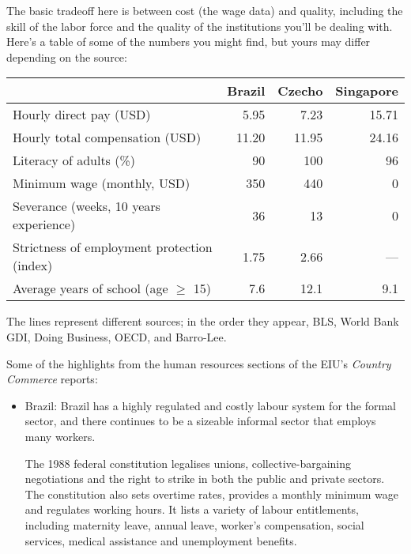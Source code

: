 \documentclass[12pt]{exam}
\begin{document}
\begin{questions}
\begin{solution}
The basic tradeoff here is between cost (the wage data)
and quality, including the skill of the labor force and
the quality of the institutions you'll be dealing with.
Here's a table of some of the numbers you might find,
but yours may differ depending on the source:

\begin{center}
\begin{tabular}{lrrr}
\toprule
		& Brazil & Czecho  & Singapore  \\
\midrule
Hourly direct pay (USD)           & 5.95   & 7.23& 15.71 \\
Hourly total compensation (USD)   & 11.20  & 11.95 & 24.16 \\
\midrule
Literacy of adults  (\%)    &  90 & 100 & 96 \\
\midrule
Minimum wage (monthly, USD) & 350 & 440 & 0 \\
Severance (weeks, 10 years experience)
                    & 36 & 13 & 0 \\
\midrule
Strictness of employment protection (index)
                & 1.75 & 2.66 & --- \\
\midrule
Average years of school (age $\geq$ 15) & 7.6 & 12.1 & 9.1 \\
\bottomrule
\end{tabular}
\end{center}

The lines represent different sources;
in the order they appear,
BLS, World Bank GDI, Doing Business, OECD,
and Barro-Lee.

Some of the highlights from the human resources sections
of the EIU's {\it Country Commerce\/} reports:
\begin{itemize}
\item Brazil:
Brazil has a highly regulated and costly labour system for the formal sector, and
there continues to be a sizeable informal sector that employs many workers.

The 1988 federal constitution legalises unions, collective-bargaining negotiations
and the right to strike in both the public and private
sectors. The constitution also sets overtime rates, provides a monthly minimum
wage and regulates working hours. It lists a variety of labour entitlements,
including maternity leave, annual leave, worker's compensation,
social services, medical assistance and unemployment benefits.


\end{itemize}
\end{solution}
\end{questions}
\end{document}
